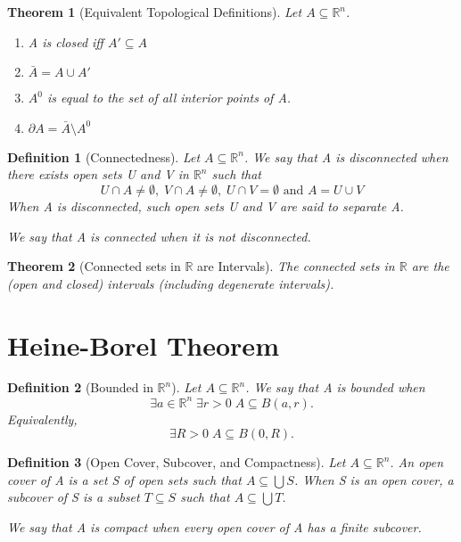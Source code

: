 \documentclass[11pt, oneside]{book}
\theoremstyle{break}
\newtheorem{thm}{Theorem}[section]
\newtheorem{defn}{Definition}[section]
\newcommand{\bb}[1]{\mathbb{#1}}		%
\begin{document}
\begin{thm}[Equivalent Topological Definitions]
	Let $A \subseteq \bb{R}^n$.
	\begin{enumerate}
		\item A is closed iff $A' \subseteq A$
		\item $\bar{A} = A \cup A'$
		\item $A^0$ is equal to the set of all interior points of A.
		\item $\partial A = \bar{A} \setminus A^0$
	\end{enumerate}
\end{thm}

\begin{defn}[Connectedness]
	Let $A \subseteq \bb{R}^n$. We say that A is disconnected when there exists open sets U and V in $\bb{R}^n$ such that
	\begin{equation*}
		U \cap A \neq \emptyset, \; V \cap A \neq \emptyset, \; U \cap V = \emptyset \text{ and } A = U \cup V
	\end{equation*}
	When A is disconnected, such open sets U and V are said to separate A.

	We say that A is connected when it is not disconnected.
\end{defn}

\begin{thm}[Connected sets in $\bb{R}$ are Intervals]
	The connected sets in $\bb{R}$ are the (open and closed) intervals (including degenerate intervals).
\end{thm}


\section{Heine-Borel Theorem}

\begin{defn}[Bounded in $\bb{R}^n$]
	Let $A \subseteq \bb{R}^n$. We say that A is bounded when
	\begin{equation*}
		\exists a \in \bb{R}^n \; \exists r > 0 \; A \subseteq B(a, r).
 	\end{equation*}
 	Equivalently,
 	\begin{equation*}
 		\exists R > 0 \; A \subseteq B(0, R).
 	\end{equation*}
\end{defn}

\begin{defn}[Open Cover, Subcover, and Compactness]
	Let $A \subseteq \bb{R}^n$. An open cover of A is a set S of open sets such that $A \subseteq \bigcup S$. When S is an open cover, a subcover of S is a subset $T \subseteq S$ such that $A \subseteq \bigcup T$.

	We say that A is compact when every open cover of A has a finite subcover.
\end{defn}
\end{document}
